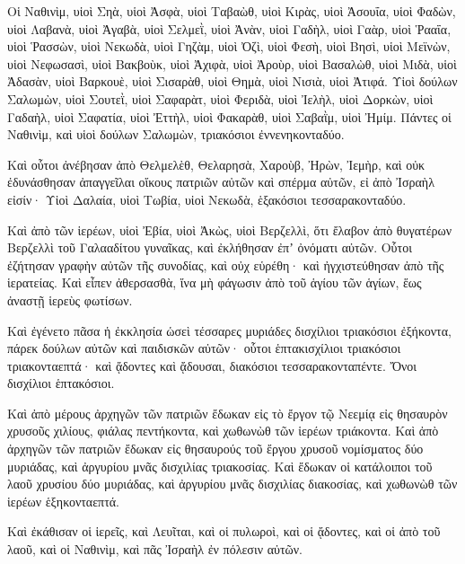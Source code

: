 {\par }{\PP {}Οἱ Ναθινὶμ, υἱοὶ Σηὰ, υἱοὶ Ἀσφὰ, υἱοὶ Ταβαὼθ,
υἱοὶ Κιρὰς, υἱοὶ Ἀσουΐα, υἱοὶ Φαδὼν,
υἱοὶ Λαβανὰ, υἱοὶ Ἀγαβὰ, υἱοὶ Σελμεῒ,
υἱοὶ Ἀνὰν, υἱοὶ Γαδὴλ, υἱοὶ Γαὰρ,
υἱοὶ Ῥααΐα, υἱοὶ Ῥασσὼν, υἱοὶ Νεκωδὰ,
υἱοὶ Γηζὰμ, υἱοὶ Ὀζὶ, υἱοὶ Φεσὴ,
υἱοὶ Βησὶ, υἱοὶ Μεϊνὼν, υἱοὶ Νεφωσασὶ,
υἱοὶ Βακβοὺκ, υἱοὶ Ἀχιφὰ, υἱοὶ Ἀροὺρ,
υἱοὶ Βασαλὼθ, υἱοὶ Μιδὰ, υἱοὶ Ἀδασὰν,
υἱοὶ Βαρκουὲ, υἱοὶ Σισαρὰθ, υἱοὶ Θημὰ,
υἱοὶ Νισιὰ, υἱοὶ Ἀτιφά.
Υἱοὶ δούλων Σαλωμὼν, υἱοὶ Σουτεῒ, υἱοὶ Σαφαρὰτ, υἱοὶ Φεριδὰ,
υἱοὶ Ἰελὴλ, υἱοὶ Δορκὼν, υἱοὶ Γαδαὴλ,
υἱοὶ Σαφατία, υἱοὶ Ἐττὴλ, υἱοὶ Φακαρὰθ, υἱοὶ Σαβαῒμ, υἱοὶ Ἠμίμ.
Πάντες οἱ Ναθινὶμ, καὶ υἱοὶ δούλων Σαλωμὼν, τριακόσιοι ἐννενηκονταδύο.
\par }{\PP {}Καὶ οὗτοι ἀνέβησαν ἀπὸ Θελμελὲθ, Θελαρησὰ, Χαροὺβ, Ἠρὼν, Ἰεμὴρ, καὶ οὐκ ἐδυνάσθησαν ἀπαγγεῖλαι οἴκους πατριῶν αὐτῶν καὶ σπέρμα αὐτῶν, εἰ ἀπὸ Ἰσραὴλ εἰσίν·
Υἱοὶ Δαλαία, υἱοὶ Τωβία, υἱοὶ Νεκωδὰ, ἑξακόσιοι τεσσαρακονταδύο.
\par }{\PP {}Καὶ ἀπὸ τῶν ἱερέων, υἱοὶ Ἐβία, υἱοὶ Ἀκὼς, υἱοὶ Βερζελλὶ, ὅτι ἔλαβον ἀπὸ θυγατέρων Βερζελλὶ τοῦ Γαλααδίτου γυναῖκας, καὶ ἐκλήθησαν ἐπʼ ὀνόματι αὐτῶν.
Οὗτοι ἐζήτησαν γραφὴν αὐτῶν τῆς συνοδίας, καὶ οὐχ εὑρέθη· καὶ ἠγχιστεύθησαν ἀπὸ τῆς ἱερατείας.
Καὶ εἶπεν ἀθερσασθὰ, ἵνα μὴ φάγωσιν ἀπὸ τοῦ ἁγίου τῶν ἁγίων, ἕως ἀναστῇ ἱερεὺς φωτίσων.
\par }{\PP {}Καὶ ἐγένετο πᾶσα ἡ ἐκκλησία ὡσεὶ τέσσαρες μυριάδες δισχίλιοι τριακόσιοι ἐξήκοντα,
πάρεκ δούλων αὐτῶν καὶ παιδισκῶν αὐτῶν· οὗτοι ἑπτακισχίλιοι τριακόσιοι τριακονταεπτά· καὶ ᾄδοντες καὶ ᾄδουσαι, διακόσιοι τεσσαρακονταπέντε.
Ὄνοι δισχίλιοι ἑπτακόσιοι.
\par }{\PP {}Καὶ ἀπὸ μέρους ἀρχηγῶν τῶν πατριῶν ἔδωκαν εἰς τὸ ἔργον τῷ Νεεμίᾳ εἰς θησαυρὸν χρυσοῦς χιλίους, φιάλας πεντήκοντα, καὶ χωθωνὼθ τῶν ἱερέων τριάκοντα.
Καὶ ἀπὸ ἀρχηγῶν τῶν πατριῶν ἔδωκαν εἰς θησαυρούς τοῦ ἔργου χρυσοῦ νομίσματος δύο μυριάδας, καὶ ἀργυρίου μνᾶς δισχιλίας τριακοσίας.
Καὶ ἔδωκαν οἱ κατάλοιποι τοῦ λαοῦ χρυσίου δύο μυριάδας, καὶ ἀργυρίου μνᾶς δισχιλίας διακοσίας, καὶ χωθωνὼθ τῶν ἱερέων ἑξηκονταεπτά.
\par }{\PP {}Καὶ ἐκάθισαν οἱ ἱερεῖς, καὶ Λευῖται, καὶ οἱ πυλωροὶ, καὶ οἱ ᾄδοντες, καὶ οἱ ἀπὸ τοῦ λαοῦ, καὶ οἱ Ναθινὶμ, καὶ πᾶς Ἰσραὴλ ἐν πόλεσιν αὐτῶν.

}
